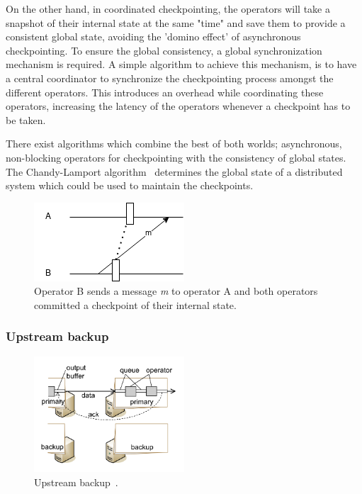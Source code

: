 On the other hand, in coordinated checkpointing, the operators will take a snapshot 
of their internal state at the same "time" and save them to provide a consistent 
global state, avoiding the 'domino effect' of asynchronous checkpointing. To ensure 
the global consistency, a global synchronization mechanism is required. A simple 
algorithm to achieve this mechanism, is to have a central coordinator to synchronize 
the checkpointing process amongst the different operators. This introduces an overhead 
while coordinating these operators, increasing the latency of the operators whenever a 
checkpoint has to be taken. 


There exist algorithms which combine the best of both worlds; asynchronous, non-blocking
operators for checkpointing with the consistency of global states. 
The Chandy-Lamport algorithm~\cite{chandy_lamport} determines the 
global state of a distributed system which could be used to maintain the checkpoints. 

\begin{figure}[!htbp]
    \centering
    \includegraphics{fig/checkpoint_inconsistency.png}
    \caption{Operator B sends a message \emph{m} to operator A and both operators 
    committed a checkpoint of their internal state.}
    \label{fig:checkpoint_inconsistency}
\end{figure}

\subsubsection{Upstream backup}

\begin{figure}[!htbp]
    \centering
    \includegraphics[width=0.5\textwidth]{fig/upstream.png}
    \caption{Upstream backup~\cite{upstream_backup}. }
    \label{fig:upstream}
    
\end{figure}


